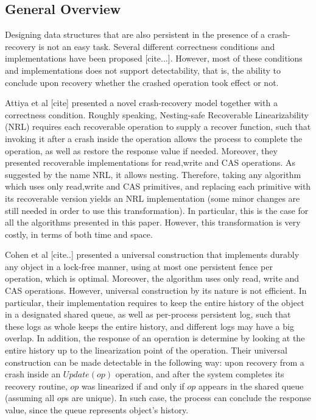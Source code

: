 \subsection{General Overview}
Designing data structures that are also persistent in the presence of a crash-recovery is not an easy task. Several different correctness conditions and implementations have been proposed [cite...]. However, most of these conditions and implementations does not support detectability, that is, the ability to conclude upon recovery whether the crashed operation took effect or not.

Attiya et al [cite] presented a novel crash-recovery model together with a correctness condition. Roughly speaking, Nesting-safe Recoverable Linearizability (NRL) requires each recoverable operation to supply a recover function, such that invoking it after a crash inside the operation allows the process to complete the operation, as well as restore the response value if needed. Moreover, they presented recoverable implementations for read,write and CAS operations. As suggested by the name NRL, it allows nesting. Therefore, taking any algorithm which uses only read,write and CAS primitives, and replacing each primitive with its recoverable version yields an NRL implementation (some minor changes are still needed in order to use this transformation). In particular, this is the case for all the algorithms presented in this paper. However, this transformation is very costly, in terms of both time and space.

Cohen et al [cite..] presented a universal construction that implements durably any object in a lock-free manner, using at most one persistent fence per operation, which is optimal. Moreover, the algorithm uses only read, write and CAS operations. However, universal construction by its nature is not efficient. In particular, their implementation requires to keep the entire history of the object in a designated shared queue, as well as per-process persistent log, such that these logs as whole keeps the entire history, and different logs may have a big overlap. In addition, the response of an operation is determine by looking at the entire history up to the linearization point of the operation. Their universal construction can be made detectable in the following way: upon recovery from a crash inside an $Update(op)$ operation, and after the system completes its recovery routine, $op$ was linearized if and only if $op$ appears in the shared queue (assuming all $op$s are unique). In such case, the process can conclude the response value, since the queue represents object's history.

